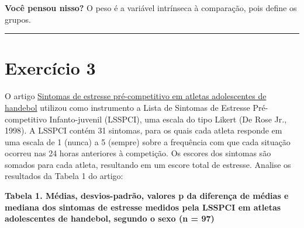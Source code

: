 \documentclass[
]{book}
\begin{document}
\textbf{Você pensou nisso?}
O peso é a variável intrínseca à comparação, pois define os grupos.

\begin{center}\rule{0.5\linewidth}{0.5pt}\end{center}

\section{Exercício 3}\label{exercuxedcio-3}

O artigo \href{https://www.scielo.br/j/rbce/a/WkdgtTdkykSVHJ9rGYGh7Lx/?format=pdf&lang=pt}{Sintomas de estresse pré-competitivo em atletas adolescentes de handebol} utilizou como instrumento a Lista de Sintomas de Estresse Pré-competitivo Infanto-juvenil (LSSPCI), uma escala do tipo Likert (De Rose Jr., 1998). A LSSPCI contém 31 sintomas, para os quais cada atleta responde em uma escala de 1 (nunca) a 5 (sempre) sobre a frequência com que cada situação ocorreu nas 24 horas anteriores à competição. Os escores dos sintomas são somados para cada atleta, resultando em um escore total de estresse. Analise os resultados da Tabela 1 do artigo:

\textbf{Tabela 1. Médias, desvios-padrão, valores p da diferença de médias e mediana dos sintomas de estresse medidos pela LSSPCI em atletas adolescentes de handebol, segundo o sexo (n = 97)}
\end{document}

